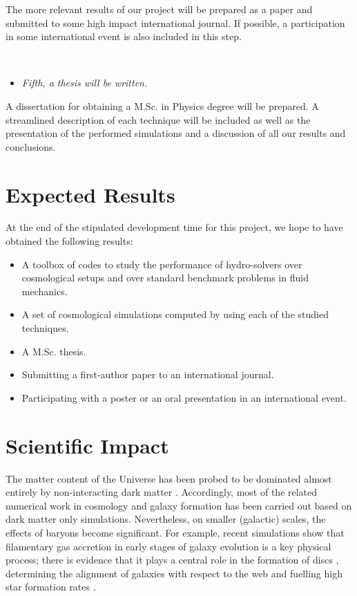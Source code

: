 \documentclass[a4,useAMS,usenatbib,usegraphicx,12pt]{article}
\begin{document}
The more relevant results of our project will be prepared as a paper and 
submitted to some high impact international journal. If possible, a participation
in some international event is also included in this step.

\

\begin{itemize}
\item[\checkmark] \textit{Fifth, a thesis will be written.}
\end{itemize}


A dissertation for obtaining a M.Sc. in Physics degree will be prepared. A
streamlined description of each technique will be included as well as the 
presentation of the performed simulations and a discussion of all our results
and conclusions.


\section{Expected Results}
At the end of the stipulated development time for this project, we hope to have
obtained the following results:
\begin{itemize}
\item A toolbox of codes to study the performance of hydro-solvers over 
cosmological setups and over standard benchmark problems in fluid mechanics.
\item A set of cosmological simulations computed by using each of the studied
techniques.
\item A M.Sc. thesis.
\item Submitting a first-author paper to an international journal.
\item Participating with a poster or an oral presentation in an international
event.
\end{itemize}


\section{Scientific Impact}
The matter content of the Universe has been probed to be dominated almost 
entirely by non-interacting dark matter \citet{Planck13XVI}. Accordingly, most
of the related numerical work in cosmology and galaxy formation has been carried
out based on dark matter only simulations. Nevertheless, on smaller (galactic)
scales, the effects of baryons become significant. For example, recent 
simulations show that filamentary gas accretion in early stages of galaxy 
evolution is a key physical process; there is evidence that it plays a central 
role in the formation of discs \citet{Dubois14}, determining the alignment of 
galaxies with respect to the web \citet{Hahn10} and fuelling high star formation 
rates \citet{Dekel09}.
\end{document}
